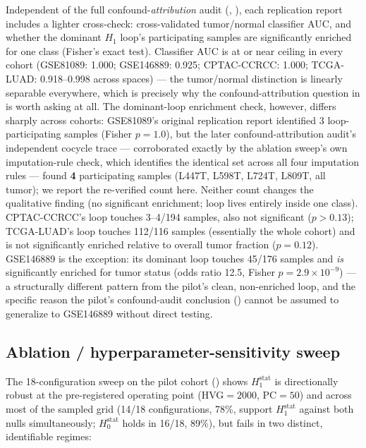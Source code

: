 Independent of the full confound-\emph{attribution} audit (, ), each replication report includes a lighter cross-check: cross-validated tumor/normal classifier AUC, and whether the dominant $H_1$ loop's participating samples are significantly enriched for one class (Fisher's exact test). Classifier AUC is at or near ceiling in every cohort (GSE81089: 1.000; GSE146889: 0.925; CPTAC-CCRCC: 1.000; TCGA-LUAD: 0.918--0.998 across spaces) --- the tumor/normal distinction is linearly separable everywhere, which is precisely why the confound-attribution question in  is worth asking at all. The dominant-loop enrichment check, however, differs sharply across cohorts: GSE81089's original replication report identified 3 loop-participating samples (Fisher $p=1.0$), but the later confound-attribution audit's independent cocycle trace --- corroborated exactly by the ablation sweep's own imputation-rule check, which identifies the identical set across all four imputation rules --- found \textbf{4} participating samples (L447T, L598T, L724T, L809T, all tumor); we report the re-verified count here. Neither count changes the qualitative finding (no significant enrichment; loop lives entirely inside one class). CPTAC-CCRCC's loop touches 3--4/194 samples, also not significant ($p>0.13$); TCGA-LUAD's loop touches 112/116 samples (essentially the whole cohort) and is not significantly enriched relative to overall tumor fraction ($p=0.12$). GSE146889 is the exception: its dominant loop touches 45/176 samples and \emph{is} significantly enriched for tumor status (odds ratio 12.5, Fisher $p=2.9\times10^{-9}$) --- a structurally different pattern from the pilot's clean, non-enriched loop, and the specific reason the pilot's confound-audit conclusion () cannot be assumed to generalize to GSE146889 without direct testing.

\subsection{Ablation / hyperparameter-sensitivity sweep}

The 18-configuration sweep on the pilot cohort () shows $H_1^{\text{stat}}$ is directionally robust at the pre-registered operating point (HVG$=2000$, PC$=50$) and across most of the sampled grid (14/18 configurations, 78\%, support $H_1^{\text{stat}}$ against both nulls simultaneously; $H_0^{\text{stat}}$ holds in 16/18, 89\%), but fails in two distinct, identifiable regimes:

